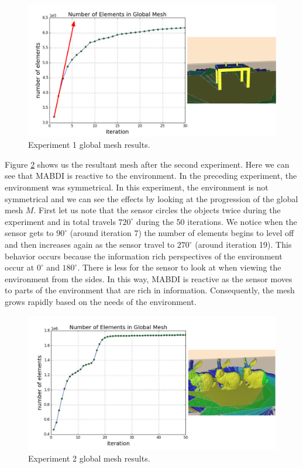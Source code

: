 \begin{figure}[h]%
\centering
  \includegraphics[width=\textwidth]{figures/diagram_run1_gm.pdf}
  \caption{Experiment 1 global mesh results.}
  \label{fig:gm_1}
\end{figure}

Figure \ref{fig:gm_2} shows us the resultant mesh after the second experiment.
Here we can see that MABDI is reactive to the environment. In the preceding
experiment, the environment was symmetrical. In this experiment, the environment
is not symmetrical and we can see the effects by looking at the progression of
the global mesh $M$. First let us note that the sensor circles the objects twice
during the experiment and in total travels $720^{\circ}$ during the 50
iterations. We notice when the sensor gets to $90^{\circ}$ (around iteration
7) the number of elements begins to level off and then increases again as the
sensor travel to $270^{\circ}$ (around iteration 19). This behavior occurs
because the information rich perspectives of the environment occur at
$0^{\circ}$ and $180^{\circ}$. There is less for the sensor to look at when
viewing the environment from the sides. In this way, MABDI is reactive as the
sensor moves to parts of the environment that are rich in information.
Consequently, the mesh grows rapidly based on the needs of the environment.

\begin{figure}[h]%
\centering
  \includegraphics[width=\textwidth]{figures/diagram_run2_gm.pdf}
  \caption{Experiment 2 global mesh results.}
  \label{fig:gm_2}
\end{figure}

